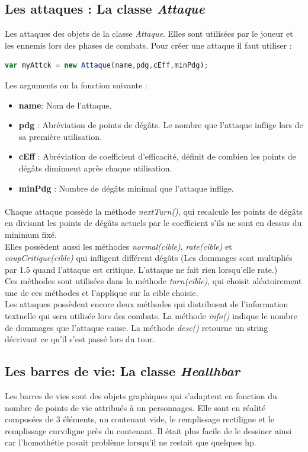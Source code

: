 \documentclass[11pt]{article}
\begin{document}
\begin{appendices}
\subsection{Les attaques : La classe \textit{Attaque}}
Les attaques des objets de la classe \textit{Attaque}. Elles sont utilisées par le joueur et les ennemis lors des phases de combats. Pour créer une attaque il faut utiliser : 
\begin{lstlisting}[language=JavaScript]
var myAttck = new Attaque(name,pdg,cEff,minPdg);
\end{lstlisting} 
Les arguments on la fonction suivante : 
\begin{itemize}
\item \textbf{name}: Nom de l'attaque.
\item \textbf{pdg} : Abréviation de points de dégâts. Le nombre que l'attaque inflige lors de sa première utilisation.
\item \textbf{cEff} : Abréviation de coefficient d'efficacité, définit de combien les points de dégâts diminuent après chaque utilisation.
\item \textbf{minPdg} : Nombre de dégâts minimal que l'attaque inflige.
\end{itemize}
\paragraph{}

Chaque attaque possède la méthode \textit{nextTurn()}, qui recalcule les points de dégâts en divisant les points de dégâts actuels par le coefficient s'ils ne sont en dessus du minimum fixé.\\

Elles possèdent aussi les méthodes \textit{normal(cible)}, \textit{rate(cible)} et \textit{coupCritique(cible)} qui infligent différent dégâts (Les dommages sont multipliés par 1.5 quand l'attaque est critique. L'attaque ne fait rien lorsqu'elle rate.)\\
Ces méthodes sont utilisées dans la méthode \textit{turn(cible)}, qui choisit aléatoirement une de ces méthodes et l'applique sur la cible choisie. \\

Les attaques possèdent encore deux méthodes qui distribuent de l'information textuelle qui sera utilisée lors des combats. La méthode \textit{info()} indique le nombre de dommages que l'attaque cause. La méthode \textit{desc()} retourne un string décrivant ce qu'il s'est passé lors du tour.
\subsection{Les barres de vie: La classe \textit{Healthbar}}
Les barres de vies sont des objets graphiques qui s'adaptent en fonction du nombre de points de vie attribués à un personnages. Elle sont en réalité composées de 3 éléments, un contenant vide, le remplissage rectiligne et le remplissage curviligne près du contenant. Il était plus facile de le dessiner ainsi car l'homothétie posait problème lorsqu'il ne restait que quelques hp. \\


\end{appendices}
\end{document}
